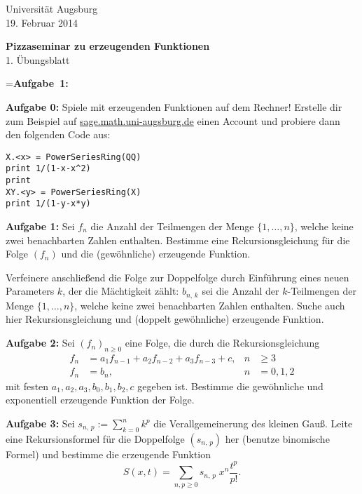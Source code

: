 \documentclass[a4paper,ngerman]{scrartcl}
\theoremstyle{definition}
\theoremstyle{plain}
\theoremstyle{remark}
\begin{document}
\vspace*{-4em}
\begin{flushright}Universität Augsburg \\ 19. Februar 2014\end{flushright}

\begin{center}\Large \textbf{Pizzaseminar zu erzeugenden Funktionen} \\
1. Übungsblatt
\end{center}
\vspace{2em}

\newbox{\mybox}
\setbox\mybox=\hbox{\textbf{Aufgabe 1:}}

\begin{list}{}{\wd\mybox \leftmargin\wd\mybox \itemsep 1.3em}
\item[\textbf{Aufgabe 0:}] Spiele mit erzeugenden Funktionen auf dem Rechner! Erstelle dir zum Beispiel auf \url{sage.math.uni-augsburg.de} einen Account und probiere dann den folgenden Code aus:
\begin{verbatim}
X.<x> = PowerSeriesRing(QQ)
print 1/(1-x-x^2)
print  
XY.<y> = PowerSeriesRing(X)
print 1/(1-y-x*y)
\end{verbatim} 

\item[\textbf{Aufgabe 1:}] Sei $f_n$ die Anzahl der Teilmengen der Menge $\{1,\ldots,n\}$, welche keine zwei benachbarten Zahlen enthalten. Bestimme eine Rekursionsgleichung für die Folge $(f_n)$ und die (gewöhnliche) erzeugende Funktion.

Verfeinere anschließend die Folge zur Doppelfolge durch Einführung eines neuen Parameters $k$, der die Mächtigkeit zählt: $b_{n,\,k}$ sei die Anzahl der $k$-Teilmengen der Menge $\{1,\ldots,n\}$, welche keine zwei benachbarten Zahlen enthalten. Suche auch hier Rekursionsgleichung und (doppelt gewöhnliche) erzeugende Funktion.
\item[\textbf{Aufgabe 2:}] Sei $(f_n)_{n\geq 0}$ eine Folge, die durch die Rekursionsgleichung 
\begin{align*}
f_n &= a_1f_{n-1} + a_2f_{n-2} + a_3f_{n-3} + c, & n &\geq 3 \\
f_n &= b_n , & n &= 0,1,2
\end{align*}
mit festen $a_1, a_2, a_3, b_0, b_1, b_2, c$ gegeben ist. Bestimme die gewöhnliche und exponentiell erzeugende Funktion der Folge.

\item[\textbf{Aufgabe 3:}] Sei $s_{n,\,p} := \sum_{k=0}^n k^p$ die Verallgemeinerung des kleinen Gauß. Leite eine Rekursionsformel für die Doppelfolge $(s_{n,\,p})$ her (benutze binomische Formel) und bestimme die erzeugende Funktion 
$$ S(x,t) = \sum_{n,p \geq 0} s_{n,\,p}\;x^n\frac{t^p}{p!}.
$$
\end{list}
\end{document}
